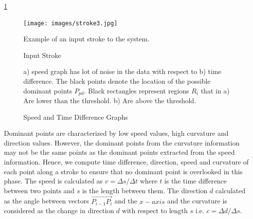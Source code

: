 \documentclass[preprint,1p,times,review]{elsarticle}
\begin{document}
\ref{fig:orignalStroke}

 \begin{figure}[h]
	\centering
		\texttt{[image: images/stroke3.jpg]}
	\caption{Input Stroke} Example of an input stroke to the system.
	\label{fig:orignalStroke}
\end{figure}

 \begin{figure}
	\centering
			\hfill
	\caption{Speed and Time Difference Graphs}  a) speed graph has lot of noise in
	the data with respect to b) time difference.   The black points denote the location of the possible dominant points $P_{pd}$. Black rectangles represent regions $R_i$ that in a) Are lower than the threshold. b) Are above the threshold.
	\label{fig:speed2Distance}
\end{figure}

Dominant points are characterized by low speed values, high curvature and direction values. However, the dominant points from the curvature information may not be the same points as the dominant points extracted from the speed information. Hence, we compute time difference, direction, speed and curvature of each point along a stroke to ensure that no dominant point is overlooked in this phase. The speed is calculated as $v=\Delta s/\Delta t$ where $t$ is the time difference between two points and $s$ is the length between them. The direction $d$ calculated as the angle between vectors $\overrightarrow {P_{i - 1} P_i }$ and the $x-axis$ and the curvature is considered as the change in direction $d$ with respect to length $s$ i.e. $c= \Delta d/\Delta s$.
\end{document}
